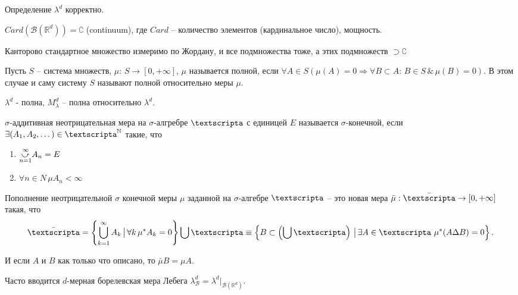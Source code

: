 \documentclass[a4paper, 12pt]{article}
\begin{document}
\begin{enumerate}[a)]
    \begin{theorem}
        Определение $\lambda ^ d$ корректно.
    \end{theorem}
    
    \begin{remark}
        $Card(\mathcal{B}(\mathbb{R}^d)) = \complement$ (continuum), где $Card$ -- количество элементов (кардинальное число), мощность.
    \end{remark}

    \begin{example}
        Канторово стандартное множество измеримо по Жордану, и все подмножества тоже, а этих подмножеств $\supset \complement$ 
    \end{example}

    \begin{definition}
        Пусть $S$ -- система множеств, $\mu:\, S \rightarrow [0, +\infty]$, $\mu$ называется полной, если $\forall A \in S(\mu (A) = 0 \Rightarrow \forall B \subset A: \, B \in S \,\&\, \mu (B) = 0)$. В этом случае и саму систему $S$ называют полной относительно меры $\mu$.
    \end{definition}

    \begin{consequence}
        $\lambda^d$ - полна, $M_{\lambda}^d$ -- полна относительно $\lambda^d$.
    \end{consequence}
    
    \begin{definition}
        $\sigma$-аддитивная неотрицательная мера на $\sigma$-алгребре $\text{\textscripta}$ с единицей $E$ называется $\sigma$-конечной, если $\exists (A_1, A_2, \dots) \in \text{\textscripta}^{\mathbb{N}}$ такие, что
        \begin{enumerate}[1)]
            \item $\cuparr{n = 1}{\infty} A_n = E$
            \item $\forall n \in N\, \mu A_n < \infty$
        \end{enumerate}
    \end{definition}

    \begin{definition}
        Пополнение неотрицательной $\sigma$ конечной меры $\mu$ заданной на $\sigma$-алгебре $\text{\textscripta}$ -- это новая мера $\bar{\mu}: \bar{\text{\textscripta}} \rightarrow [0, +\infty]$ такая, что 
        $$\bar{\text{\textscripta}} = \left\{ \bigcup \limits_{k = 1}^{\infty} A_k \,\big|\, \forall k \, \mu^* A_k = 0\right\} \bigcup \text{\textscripta} \equiv \left\{ B \subset \left(\bigcup \text{\textscripta}\right) \,\big|\, \exists A \in \text{\textscripta}\,\, \mu^*(A \Delta B) = 0 \right\}.$$
    \end{definition}
    И если $A$ и $B$ как только что описано, то $\bar{\mu} B = \mu A$.

    Часто вводится $d$-мерная борелевская мера Лебега $\lambda^d_{\mathcal{B}} = \lambda^d \big|_{\mathcal{B}(\mathbb{R}^d)}$.

\end{enumerate}
\end{document}
